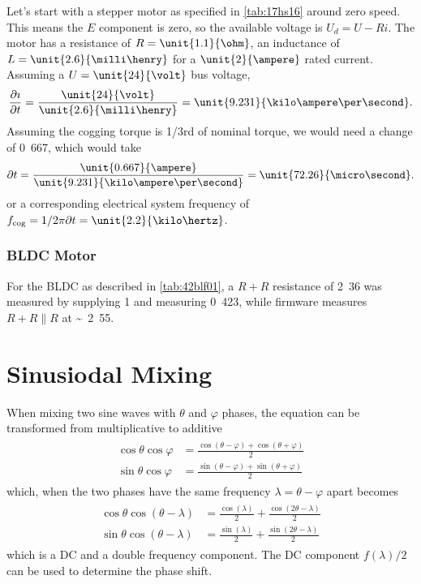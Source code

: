 \documentclass[12pt,a4paper,oneside,openany]{article}
\begin{document}
Let's start with a stepper motor as specified in \cref{tab:17hs16} around zero speed. This means the $E$ component is zero, so the available voltage is $U_d = U - R i$. The motor has a resistance of $R=\unit{1.1}{\ohm}$, an inductance of $L=\unit{2.6}{\milli\henry}$ for a $\unit{2}{\ampere}$ rated current. Assuming a $U=\unit{24}{\volt}$ bus voltage,
\begin{gather}
\begin{aligned}
\frac{\partial \imath}{\partial t} = \frac{\unit{24}{\volt}}{\unit{2.6}{\milli\henry}} = \unit{9.231}{\kilo\ampere\per\second}.
\end{aligned}
\end{gather}
Assuming the cogging torque is 1/3rd of nominal torque, we would need a change of \unit{0.667}{\ampere}, which would take
\begin{gather}
\begin{aligned}
{\partial t} = \frac{\unit{0.667}{\ampere}}{\unit{9.231}{\kilo\ampere\per\second}} = \unit{72.26}{\micro\second}.
\end{aligned}
\end{gather}
or a corresponding electrical system frequency of $f_{\mathrm{cog}} = 1 / 2 \pi \partial t = \unit{2.2}{\kilo\hertz}$.

\subsubsection{BLDC Motor}

For the BLDC as described in \cref{tab:42blf01}, a $R + R$ resistance of \unit{2.36}{\ohm} was measured by supplying \unit{1}{\volt} and measuring \unit{0.423}{\ampere}, while firmware measures $R + R \parallel R$ at \unit{\sim 2.55}{\ohm}.


\appendix

\section{Sinusiodal Mixing}

When mixing two sine waves with $\theta$ and $\varphi$ phases, the equation can be transformed from multiplicative to additive
\begin{gather}
\begin{aligned}
\cos \theta \cos \varphi &= \frac{\cos (\theta - \varphi) + \cos (\theta + \varphi)}{2} \\
\sin \theta \cos \varphi &= \frac{\sin (\theta - \varphi) + \sin (\theta + \varphi)}{2}
\end{aligned}
\end{gather}
which, when the two phases have the same frequency $\lambda = \theta - \varphi$ apart becomes
\begin{gather}
\begin{aligned}
\cos \theta \cos (\theta - \lambda) &= \frac{\cos (\lambda)}{2} + \frac{\cos (2 \theta - \lambda)}{2} \\
\sin \theta \cos (\theta - \lambda) &= \frac{\sin (\lambda)}{2} + \frac{\sin (2 \theta - \lambda)}{2}
\end{aligned}
\end{gather}
which is a DC and a double frequency component. The DC component $f (\lambda)  / 2$ can be used to determine the phase shift.
\end{document}
